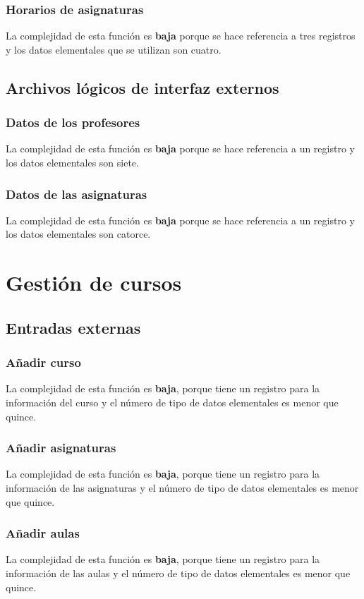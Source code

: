 \documentclass[11pt,a4paper,spanish,twoside]{book}
\begin{document}
\subsubsection{Horarios de asignaturas}
La complejidad de esta función es \textbf{baja} porque se hace referencia a
tres registros y los datos elementales que se utilizan son cuatro.

\subsection{Archivos lógicos de interfaz externos}
\subsubsection{Datos de los profesores}
La complejidad de esta función es \textbf{baja} porque se hace referencia a
un registro y los datos elementales son siete.

\subsubsection{Datos de las asignaturas}
La complejidad de esta función es \textbf{baja} porque se hace referencia a
un registro y los datos elementales son catorce.

\section{Gestión de cursos}
\subsection{Entradas externas}
\subsubsection{Añadir curso}
La complejidad de esta función es \textbf{baja}, porque tiene un
registro para la información del curso y el número de tipo de datos
elementales es menor que quince.
\subsubsection{Añadir asignaturas}
La complejidad de esta función es \textbf{baja}, porque tiene un
registro para la información de las asignaturas y el número de tipo de datos
elementales es menor que quince.
\subsubsection{Añadir aulas}
La complejidad de esta función es \textbf{baja}, porque tiene un
registro para la información de las aulas y el número de tipo de datos
elementales es menor que quince.
\end{document}
